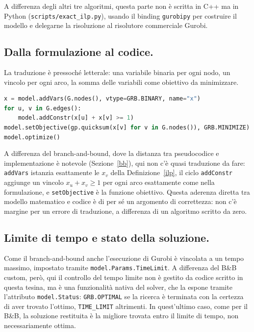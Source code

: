 A differenza degli altri tre algoritmi, questa parte non è scritta in C++ ma in Python (\texttt{scripts/exact\_ilp.py}), usando il binding \texttt{gurobipy} per costruire il modello e delegarne la risoluzione al risolutore commerciale Gurobi.

\subsection{Dalla formulazione al codice.} La traduzione è pressoché letterale: una variabile binaria per ogni nodo, un vincolo per ogni arco, la somma delle variabili come obiettivo da minimizzare.

\begin{lstlisting}[language=Python, caption={Formulazione ILP del Minimum Vertex Cover (\texttt{scripts/exact\_ilp.py})}]
x = model.addVars(G.nodes(), vtype=GRB.BINARY, name="x")
for u, v in G.edges():
    model.addConstr(x[u] + x[v] >= 1)
model.setObjective(gp.quicksum(x[v] for v in G.nodes()), GRB.MINIMIZE)
model.optimize()
\end{lstlisting}

A differenza del branch-and-bound, dove la distanza tra pseudocodice e implementazione è notevole (Sezione~\ref{bb}), qui non c'è quasi traduzione da fare: \texttt{addVars} istanzia esattamente le $x_v$ della Definizione~\ref{ilp}, il ciclo \texttt{addConstr} aggiunge un vincolo $x_u+x_v\ge1$ per ogni arco esattamente come nella formulazione, e \texttt{setObjective} è la funzione obiettivo. Questa aderenza diretta tra modello matematico e codice è di per sé un argomento di correttezza: non c'è margine per un errore di traduzione, a differenza di un algoritmo scritto da zero.

\subsection{Limite di tempo e stato della soluzione.} Come il branch-and-bound anche l'esecuzione di Gurobi è vincolata a un tempo massimo, impostato tramite \texttt{model.Params.TimeLimit}. A differenza del B\&B custom, però, qui il controllo del tempo limite non è gestito da codice scritto in questa tesina, ma è una funzionalità nativa del solver, che la espone tramite l'attributo \texttt{model.Status}: \texttt{GRB.OPTIMAL} se la ricerca è terminata con la certezza di aver trovato l'ottimo, \texttt{TIME\_LIMIT} altrimenti. In quest'ultimo caso, come per il B\&B, la soluzione restituita è la migliore trovata entro il limite di tempo, non necessariamente ottima.

